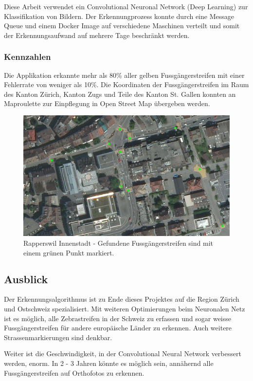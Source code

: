 Diese Arbeit verwendet ein Convolutional Neuronal Network (Deep Learning) zur Klassifikation von Bildern. Der Erkennungprozess konnte durch eine Message Queue und einem Docker Image auf verschiedene Maschinen verteilt und somit der Erkennungsaufwand auf mehrere Tage beschränkt werden.

\subsubsection{Kennzahlen}
Die Applikation erkannte mehr als 80\% aller gelben Fussgängerstreifen mit einer Fehlerrate von weniger als 10\%. Die Koordinaten der Fussgängerstreifen im Raum des Kanton Zürich, Kanton Zugs und Teile des Kanton St. Gallen konnten an Maproulette zur Einpflegung in Open Street Map übergeben werden.
\\
\begin{figure}[H]
	\centering
	\includegraphics[width=\textwidth -10mm]{images/boxsave_rappi.png}
	\caption[Überblick]{Rapperswil Innenstadt - Gefundene Fussgängerstreifen sind mit einem grünen Punkt markiert.}
\end{figure}

\subsection*{Ausblick}
Der Erkennungsalgorithmus ist zu Ende dieses Projektes auf die Region Zürich und Ostschweiz spezialisiert. Mit weiteren Optimierungen beim Neuronalen Netz ist es möglich, alle Zebrastreifen in der Schweiz zu erfassen und sogar weisse Fussgängerstreifen für andere europäische Länder zu erkennen. Auch weitere Strassenmarkierungen sind denkbar.

Weiter ist die Geschwindigkeit, in der Convolutional Neural Network verbessert werden, enorm. In 2 - 3 Jahren könnte es möglich sein, annähernd alle Fussgängerstreifen auf Orthofotos zu erkennen.
\newpage